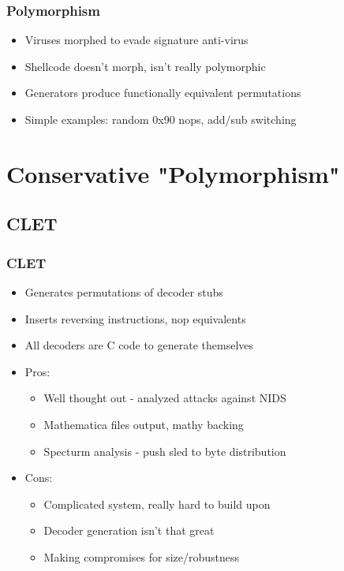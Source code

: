 \documentclass{beamer}
\newenvironment{sitemize}{\vspace{1mm}\begin{itemize}\itemsep 4pt\small}{\end{itemize}}
\begin{document}
\begin{frame}[t]
  \frametitle{Polymorphism}
  \begin{sitemize}
    \item Viruses morphed to evade signature anti-virus
    \item Shellcode doesn't morph, isn't really polymorphic
    \item Generators produce functionally equivalent permutations
    \item Simple examples: random 0x90 nops, add/sub switching
  \end{sitemize}
\end{frame}

\section{Conservative "Polymorphism"}

\subsection{CLET}

\begin{frame}[t]
  \frametitle{CLET}
  \begin{sitemize}
    \item Generates permutations of decoder stubs
    \item Inserts reversing instructions, nop equivalents
    \item All decoders are C code to generate themselves
    \pause
    \item Pros:
    \begin{sitemize}
      \item Well thought out - analyzed attacks against NIDS
      \item Mathematica files output, mathy backing
      \item Specturm analysis - push sled to byte distribution
    \end{sitemize}
    \pause
    \item Cons:
    \begin{sitemize}
      \item Complicated system, really hard to build upon
      \item Decoder generation isn't that great
      \item Making compromises for size/robustness
    \end{sitemize}
  \end{sitemize}
\end{frame}
\end{document}
